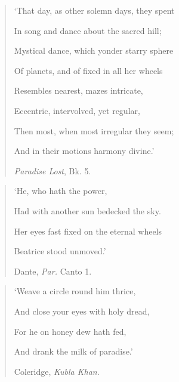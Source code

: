 \documentclass[a4paper, 11pt, oneside, polutonikogreek, english]{article}
\begin{document}
\bigskip
\centerline{\EightStarTaper}
\centerline{\EightStarTaper\EightStarTaper}
\bigskip

\begin{quotation}\small
`That day, as other solemn days, they spent

In song and dance about the sacred hill;

Mystical dance, which yonder starry sphere

Of planets, and of fixed in all her wheels

Resembles nearest, mazes intricate,

Eccentric, intervolved, yet regular,

Then most, when most irregular they seem;

And in their motions harmony divine.'

\hspace*{35mm}\emph{Paradise Lost}, Bk. 5.
\end{quotation}

\bigskip

\begin{quotation}\small
\hspace*{25mm}`He, who hath the power, 

Had with another sun bedecked the sky.

Her eyes fast fixed on the eternal wheels

Beatrice stood unmoved.'

\hspace*{35mm}Dante, \emph{Par.} Canto 1.
\end{quotation}

\bigskip

\begin{quotation}\small
`Weave a circle round him thrice,

And close your eyes with holy dread,

For he on honey dew hath fed,

And drank the milk of paradise.'

\hspace*{35mm}Coleridge, \emph{Kubla Khan}.
\end{quotation}

\bigskip
\centerline{\EightStarTaper}
\centerline{\EightStarTaper\EightStarTaper}
\bigskip
\end{document}
